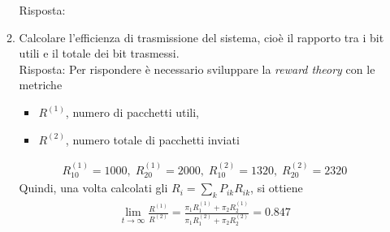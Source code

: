 \documentclass{article}
\begin{document}
\begin{enumerate}
\begin{enumerate}[label=\alph*)]
        Risposta:
        \item Calcolare l'efficienza di trasmissione del sistema, cioè il rapporto tra i bit utili e il totale dei bit trasmessi.\\
        
        Risposta: Per rispondere è necessario sviluppare la \emph{reward theory} con le metriche
        \begin{itemize}
        \item $R^{(1)}$, numero di pacchetti utili,
        \item $R^{(2)}$, numero totale di pacchetti inviati 
        \end{itemize}
        \begin{align*}
        R_{10}^{(1)} = 1000,\;R_{20}^{(1)} = 2000,\;R_{10}^{(2)} = 1320,\;R_{20}^{(2)} = 2320
        \end{align*}
        Quindi, una volta calcolati gli $R_i = \sum_k P_{ik} R_{ik}$, si ottiene
        \begin{align*}
        \lim_{t\to\infty} \frac{R^{(1)}}{R^{(2)}} = \frac{\pi_1 R_1^{(1)} + \pi_2 R_2^{(1)}}{\pi_1 R_1^{(2)} + \pi_2 R_2^{(2)}} = 0.847
        \end{align*}
    \end{enumerate}
\end{enumerate}

\newpage
\end{document}
